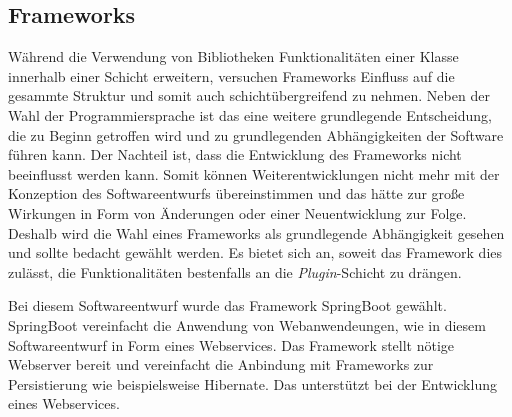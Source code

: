 \subsection*{Frameworks}
Während die Verwendung von Bibliotheken Funktionalitäten einer Klasse innerhalb einer Schicht erweitern, versuchen Frameworks Einfluss auf die gesammte Struktur und somit auch schichtübergreifend zu nehmen.
Neben der Wahl der Programmiersprache ist das eine weitere grundlegende Entscheidung, die zu Beginn getroffen wird und zu grundlegenden Abhängigkeiten der Software führen kann.
Der Nachteil ist, dass die Entwicklung des Frameworks nicht beeinflusst werden kann.
Somit können Weiterentwicklungen nicht mehr mit der Konzeption des Softwareentwurfs übereinstimmen und das hätte zur große Wirkungen in Form von Änderungen oder einer Neuentwicklung zur Folge.
Deshalb wird die Wahl eines Frameworks als grundlegende Abhängigkeit gesehen und sollte bedacht gewählt werden.
Es bietet sich an, soweit das Framework dies zulässt, die Funktionalitäten bestenfalls an die \textit{Plugin}-Schicht zu drängen.

Bei diesem Softwareentwurf wurde das Framework SpringBoot gewählt.
SpringBoot vereinfacht die Anwendung von Webanwendeungen, wie in diesem Softwareentwurf in Form eines Webservices.
Das Framework stellt nötige Webserver bereit und vereinfacht die Anbindung mit Frameworks zur Persistierung wie beispielsweise Hibernate.
Das unterstützt bei der Entwicklung eines Webservices.

